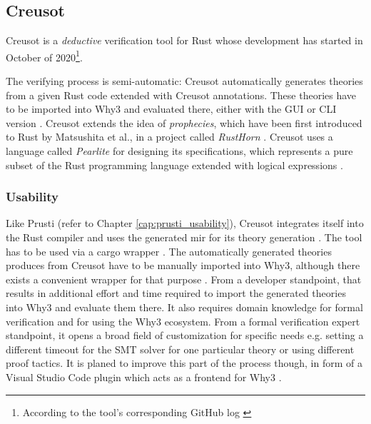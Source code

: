 \subsection{Creusot}
\label{cap:creusot}

Creusot is a \textit{deductive} verification tool for Rust whose development has started in October of 2020\footnote{According to the tool's corresponding GitHub log \cite{xavier_denis_initial_2020}}. 

The verifying process is semi-automatic: Creusot automatically generates theories from a given Rust code extended with Creusot annotations. These theories have to be imported into Why3 and evaluated there, either with the GUI or CLI version \cite{riesco_creusot_2022}. Creusot extends the idea of \textit{prophecies}, which have been first introduced to Rust by Matsushita et al., in a project called \textit{RustHorn} \cite{matsushita_rusthorn_2021, riesco_creusot_2022}. Creusot uses a language called \textit{Pearlite} for designing its specifications, which represents a pure subset of the Rust programming language extended with logical expressions \cite{xavier_denis_xldeniscreusot_2023,riesco_creusot_2022}.

\subsubsection{Usability}
\label{cap:creusot_usability}

Like Prusti (refer to Chapter \ref{cap:prusti_usability}), Creusot integrates itself into the Rust compiler and uses the generated \acs{mir} for its theory generation \cite{riesco_creusot_2022}. The tool has to be used via a cargo wrapper \cite{denis_creusot_2021}. The automatically generated theories produces from Creusot have to be manually imported into Why3, although there exists a convenient wrapper for that purpose \cite{riesco_creusot_2022, xavier_denis_xldeniscreusot_2023}.
From a developer standpoint, that results in additional effort and time required to import the generated theories into Why3 and evaluate them there. It also requires domain knowledge for formal verification and for using the Why3 ecosystem. 
From a formal verification expert standpoint, it opens a broad field of customization for specific needs e.g. setting a different timeout for the SMT solver for one particular theory or using different proof tactics.
It is planed to improve this part of the process though, in form of a Visual Studio Code plugin which acts as a frontend for Why3 \cite{xavier_denis_xldeniswhycode_2023}.

